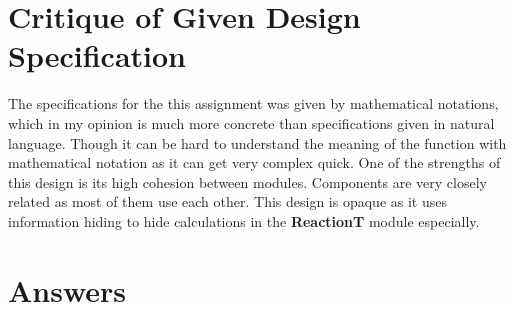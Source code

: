 \documentclass[12pt]{article}
\begin{document}
\section{Critique of Given Design Specification}
The specifications for the this assignment was given by mathematical notations, which in my opinion is much more concrete than specifications given in natural language. Though it can be hard to understand the meaning of the function with mathematical notation as it can get very complex quick. One of the strengths of this design is its high cohesion between modules. Components are very closely related as most of them use each other. This design is opaque as it uses information hiding to hide calculations in the \textbf{ReactionT} module especially.

\section{Answers}
\end{document}

